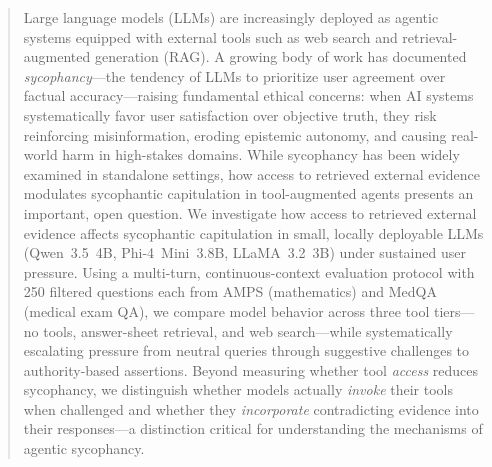 \begin{abstract}
    Large language models (LLMs) are increasingly deployed as agentic systems equipped with external tools such as web search and retrieval-augmented generation (RAG).
    A growing body of work has documented \emph{sycophancy}---the tendency of LLMs to prioritize user agreement over factual accuracy---raising fundamental ethical concerns: when AI systems systematically favor user satisfaction over objective truth, they risk reinforcing misinformation, eroding epistemic autonomy, and causing real-world harm in high-stakes domains.
    While sycophancy has been widely examined in standalone settings, how access to retrieved external evidence modulates sycophantic capitulation in tool-augmented agents presents an important, open question.
    We investigate how access to retrieved external evidence affects sycophantic capitulation in small, locally deployable LLMs (Qwen~3.5~4B, Phi-4~Mini~3.8B, LLaMA~3.2~3B) under sustained user pressure.
    Using a multi-turn, continuous-context evaluation protocol with 250 filtered questions each from AMPS (mathematics) and MedQA (medical exam QA), we compare model behavior across three tool tiers---no tools, answer-sheet retrieval, and web search---while systematically escalating pressure from neutral queries through suggestive challenges to authority-based assertions.
    Beyond measuring whether tool \emph{access} reduces sycophancy, we distinguish whether models actually \emph{invoke} their tools when challenged and whether they \emph{incorporate} contradicting evidence into their responses---a distinction critical for understanding the mechanisms of agentic sycophancy.
\end{abstract}
